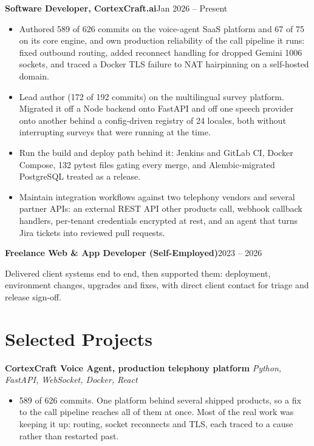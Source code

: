 \documentclass[10pt,a4paper]{article}
\newcommand{\entry}[2]{\textbf{#1}\hfill{#2}\par}
\begin{document}
\entry{Software Developer, CortexCraft.ai}{Jan 2026 -- Present}
\begin{itemize}
  \item Authored 589 of 626 commits on the voice-agent SaaS platform and 67 of 75 on its core
        engine, and own production reliability of the call pipeline it runs: fixed outbound routing,
        added reconnect handling for dropped Gemini 1006 sockets, and traced a Docker TLS failure to
        NAT hairpinning on a self-hosted domain.
  \item Lead author (172 of 192 commits) on the multilingual survey platform. Migrated it off a Node
        backend onto FastAPI and off one speech provider onto another behind a config-driven
        registry of 24 locales, both without interrupting surveys that were running at the time.
  \item Run the build and deploy path behind it: Jenkins and GitLab CI, Docker Compose, 132 pytest
        files gating every merge, and Alembic-migrated PostgreSQL treated as a release.
  \item Maintain integration workflows against two telephony vendors and several partner APIs: an
        external REST API other products call, webhook callback handlers, per-tenant credentials
        encrypted at rest, and an agent that turns Jira tickets into reviewed pull requests.
\end{itemize}

\vspace{1pt}
\entry{Freelance Web \& App Developer (Self-Employed)}{2023 -- 2026}
Delivered client systems end to end, then supported them: deployment, environment changes, upgrades
and fixes, with direct client contact for triage and release sign-off.

\section{Selected Projects}

\textbf{CortexCraft Voice Agent, production telephony platform} \textit{Python, FastAPI, WebSocket, Docker, React}
\begin{itemize}
  \item 589 of 626 commits. One platform behind several shipped products, so a fix to the call
        pipeline reaches all of them at once. Most of the real work was keeping it up: routing,
        socket reconnects and TLS, each traced to a cause rather than restarted past.
\end{itemize}
\end{document}
